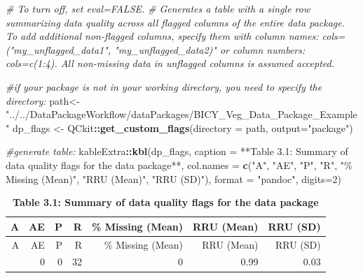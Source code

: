 \documentclass[
]{article}
\newenvironment{Shaded}{\begin{snugshade}}{\end{snugshade}}
\newcommand{\AttributeTok}[1]{\textcolor[rgb]{0.13,0.29,0.53}{#1}}
\newcommand{\CommentTok}[1]{\textcolor[rgb]{0.56,0.35,0.01}{\textit{#1}}}
\newcommand{\DecValTok}[1]{\textcolor[rgb]{0.00,0.00,0.81}{#1}}
\newcommand{\FunctionTok}[1]{\textcolor[rgb]{0.13,0.29,0.53}{\textbf{#1}}}
\newcommand{\NormalTok}[1]{#1}
\newcommand{\OtherTok}[1]{\textcolor[rgb]{0.56,0.35,0.01}{#1}}
\newcommand{\SpecialCharTok}[1]{\textcolor[rgb]{0.81,0.36,0.00}{\textbf{#1}}}
\newcommand{\StringTok}[1]{\textcolor[rgb]{0.31,0.60,0.02}{#1}}
\begin{document}
\begin{Shaded}
\begin{Highlighting}[]
\CommentTok{\# To turn off, set eval=FALSE.}
\CommentTok{\# Generates a table with a single row summarizing data quality across all flagged columns of the entire data package. To add additional non{-}flagged columns, specify them with column names: cols=("my\_unflagged\_data1", "my\_unflagged\_data2)" or column numbers: cols=c(1:4). All non{-}missing data in unflagged columns is assumed accepted. }

\CommentTok{\#if your package is not in your working directory, you need to specify the directory:}
\NormalTok{path}\OtherTok{\textless{}{-}}\StringTok{"../../DataPackageWorkflow/dataPackages/BICY\_Veg\_Data\_Package\_Example"}
\NormalTok{dp\_flags }\OtherTok{\textless{}{-}}\NormalTok{ QCkit}\SpecialCharTok{::}\FunctionTok{get\_custom\_flags}\NormalTok{(}\AttributeTok{directory =}\NormalTok{ path, }\AttributeTok{output=}\StringTok{"package"}\NormalTok{)}

\CommentTok{\#generate table:}
\NormalTok{kableExtra}\SpecialCharTok{::}\FunctionTok{kbl}\NormalTok{(dp\_flags, }\AttributeTok{caption =} \StringTok{\textquotesingle{}**Table 3.1: Summary of data quality flags for the data package**\textquotesingle{}}\NormalTok{, }\AttributeTok{col.names =} \FunctionTok{c}\NormalTok{(}\StringTok{"A"}\NormalTok{, }\StringTok{"AE"}\NormalTok{, }\StringTok{"P"}\NormalTok{, }\StringTok{"R"}\NormalTok{, }\StringTok{"\% Missing (Mean)"}\NormalTok{, }\StringTok{"RRU (Mean)"}\NormalTok{, }\StringTok{"RRU (SD)"}\NormalTok{), }\AttributeTok{format =} \StringTok{"pandoc"}\NormalTok{, }\AttributeTok{digits=}\DecValTok{2}\NormalTok{)}
\end{Highlighting}
\end{Shaded}

\begin{longtable}[]{@{}rrrrrrr@{}}
\caption{\textbf{Table 3.1: Summary of data quality flags for the data
package}}\tabularnewline
\toprule\noalign{}
A & AE & P & R & \% Missing (Mean) & RRU (Mean) & RRU (SD) \\
\midrule\noalign{}
\endfirsthead
\toprule\noalign{}
A & AE & P & R & \% Missing (Mean) & RRU (Mean) & RRU (SD) \\
\midrule\noalign{}
\endhead
\bottomrule\noalign{}
\endlastfoot
2968 & 0 & 0 & 32 & 0 & 0.99 & 0.03 \\
\end{longtable}
\end{document}
